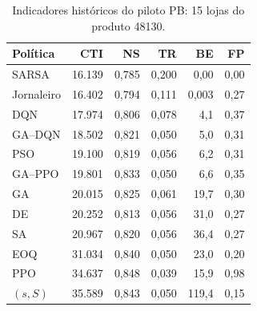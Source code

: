 \begin{table}[htbp]\centering\small
\caption{Indicadores históricos do piloto PB: 15 lojas do produto 48130.}\label{tab:global_prelim}
\begin{tabular}{@{}lrrrrr@{}}\toprule
Política & CTI & NS & TR & BE & FP\\\midrule
SARSA &16.139&0,785&0,200&0,00&0,00\\
Jornaleiro &16.402&0,794&0,111&0,003&0,27\\
DQN &17.974&0,806&0,078&4,1&0,37\\
GA--DQN &18.502&0,821&0,050&5,0&0,31\\
PSO &19.100&0,819&0,056&6,2&0,31\\
GA--PPO &19.801&0,833&0,050&6,6&0,35\\
GA &20.015&0,825&0,061&19,7&0,30\\
DE &20.252&0,813&0,056&31,0&0,27\\
SA &20.967&0,820&0,056&36,4&0,27\\
EOQ &31.034&0,840&0,050&23,0&0,20\\
PPO &34.637&0,848&0,039&15,9&0,98\\
$(s,S)$ &35.589&0,843&0,050&119,4&0,15\\
\bottomrule\end{tabular}\end{table}
